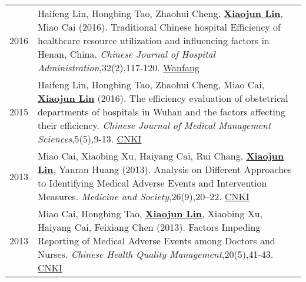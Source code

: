 \documentclass[a4paper,10pt]{article}
\begin{document}
\begin{longtable}{r p{13cm}}
2016 & Haifeng Lin, Hongbing Tao, Zhaohui Cheng, \underline{\textbf{Xiaojun Lin}}, Miao Cai (2016). Traditional Chinese hospital Efficiency of healthcare resource utilization and influencing factors in Henan, China. \emph{Chinese Journal of Hospital Administration},32(2),117-120. \href{http://www.wanfangdata.com.cn/details/detail.do?_type=perio&id=zhyygl201602013}{Wanfang}\\[5pt]

2015 & Haifeng Lin, Hongbing Tao, Zhaohui Cheng, Miao Cai, \underline{\textbf{Xiaojun Lin}} (2016). The efficiency evaluation of obstetrical departments of hospitals in Wuhan and the factors affecting their efficiency. \emph{Chinese Journal of Medical Management Sciences},5(5),9-13. \href{http://kns.cnki.net/KCMS/detail/detail.aspx?dbcode=CJFQ&dbname=CJFDLAST2015&filename=YLGL201505004&v=MjkxODIxTHV4WVM3RGgxVDNxVHJXTTFGckNVUkxLZVp1WnNGaXZtVkx2QVBDSE1Zckc0SDlUTXFvOUZZSVI4ZVg=}{CNKI}\\[5pt]

2013 & Miao Cai, Xiaobing Xu, Haiyang Cai, Rui Chang, \underline{\textbf{Xiaojun Lin}}, Yanran Huang (2013). Analysis on Different Approaches to Identifying Medical Adverse Events and Intervention Measures. \emph{Medicine and Society},26(9),20–22. \href{http://kns.cnki.net/KCMS/detail/detail.aspx?dbcode=CJFQ&dbname=CJFDHIS2&filename=YXSH201309007&v=MDAwNDFyQ1VSTEtlWnVac0Zpdm1XcnZOUERYWVpyRzRIOUxNcG85Rlk0UjhlWDFMdXhZUzdEaDFUM3FUcldNMUY=}{CNKI}\\[5pt]

2013 & Miao Cai, Hongbing Tao, \underline{\textbf{Xiaojun Lin}}, Xiaobing Xu, Haiyang Cai, Feixiang Chen (2013). Factors Impeding Reporting of Medical Adverse Events among Doctors and Nurses. \emph{Chinese Health Quality Management},20(5),41-43. \href{http://kns.cnki.net/KCMS/detail/detail.aspx?dbcode=CJFQ&dbname=CJFDHIS2&filename=WSJG201305024&v=Mjc4MDIxTHV4WVM3RGgxVDNxVHJXTTFGckNVUkxLZVp1WnNGaXZuVXJ6Tk1qN0JhYkc0SDlMTXFvOUhZSVI4ZVg=}{CNKI}\\[5pt]

\end{longtable}
\end{document}
